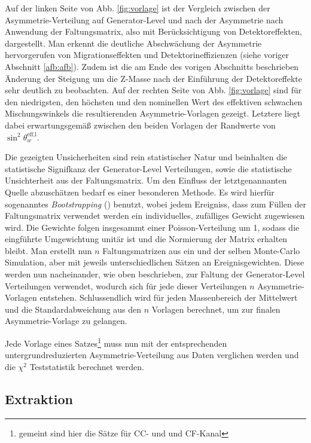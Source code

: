 Auf der linken Seite von Abb. \ref{fig:vorlage} ist der Vergleich zwischen der
Asymmetrie-Verteilung auf Generator-Level und nach der Asymmetrie nach
Anwendung der Faltungsmatrix, also mit Berücksichtigung von Detektoreffekten,
dargestellt. Man erkennt die deutliche Abschwächung der Asymmetrie
hervorgerufen von Migrationseffekten und Detektorineffizienzen (siehe voriger
Abschnitt \ref{afb:afb}). Zudem ist die am Ende des vorigen Abschnitts
beschrieben Änderung der Steigung um die Z-Masse nach der Einführung der
Detektoreffekte sehr deutlich zu beobachten. Auf der rechten Seite von Abb.
\ref{fig:vorlage} sind für den niedrigsten, den höchsten und den nominellen
Wert des effektiven schwachen Mischungswinkels die resultierenden
Asymmetrie-Vorlagen gezeigt. Letztere liegt dabei erwartungsgemäß zwischen den
beiden Vorlagen der Randwerte von $\sin^2\theta_w^\text{eff,l}$.

Die gezeigten Unsicherheiten sind rein statistischer Natur und beinhalten die
statistische Signifkanz der Generator-Level Verteilungen, sowie die
statistische Unsichterheit aus der Faltungsmatrix. Um den Einfluss der
letztgenannanten Quelle abzuschätzen bedarf es einer besonderen Methode. Es
wird hierfür sogenanntes \textit{Bootstrapping} (\cite{zbMATH03631774})
benutzt, wobei jedem Ereigniss, dass zum Füllen der Faltungsmatrix verwendet
werden ein individuelles, zufälliges Gewicht zugewiesen wird. Die Gewichte
folgen insgesammt einer Poisson-Verteilung um 1, sodass die eingführte
Umgewichtung unitär ist und die Normierung der Matrix erhalten bleibt. Man
erstellt nun $n$ Faltungsmatrizen aus ein und der selben Monte-Carlo
Simulation, aber mit jeweils unterschiedlichen Sätzen an Ereignisgewichten.
Diese werden nun nacheinander, wie oben beschrieben, zur Faltung der
Generator-Level Verteilungen verwendet, wodurch sich für jede dieser
Verteilungen $n$ Asymmetrie-Vorlagen entstehen. Schlussendlich wird für jeden
Massenbereich der Mittelwert und die Standardabweichung aus den $n$ Vorlagen
berechnet, um zur finalen Asymmetrie-Vorlage zu gelangen.

Jede Vorlage eines Satzes\footnote{gemeint sind hier die Sätze für \ac{CC}- und
und \ac{CF}-Kanal} muss nun mit der entsprechenden untergrundreduzierten
Asymmetrie-Verteilung aus Daten verglichen werden und die $\chi^2$
Teststatistik berechnet werden.



\subsection{Extraktion}
\label{afb:extraction}

